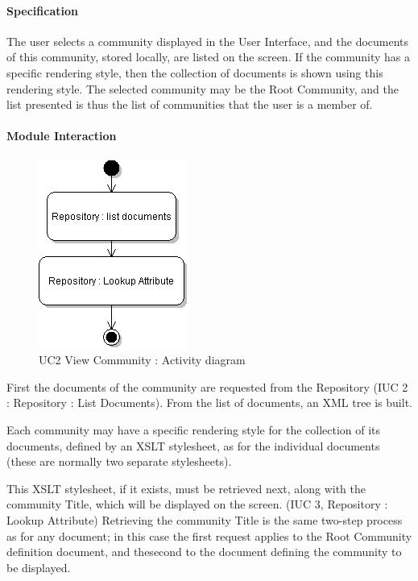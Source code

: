 \documentclass[titlepage]{article}%
\begin{document}
\paragraph{Specification}
The user selects a community displayed in the User Interface, and the documents of this community, stored locally, are listed on the screen. If the community has a specific rendering style, then the collection of documents is shown using this rendering style.
The selected community may be the Root Community, and the list presented is thus the list of communities that the user is a member of. 

\paragraph{Module Interaction}

\begin{figure}[htb]
\centering
	\includegraphics[scale=0.5]{diagrams/uc1-viewcommunity.png}
	\caption{UC2 View Community : Activity diagram}
	\label{fig:uc2}
\end{figure}

First the documents of the community are requested from the Repository (IUC 2 : Repository : List Documents). From the list of documents, an XML tree is built. 

Each community may have a specific rendering style for the collection of its documents, defined by an XSLT stylesheet, as for the individual documents (these are normally two separate stylesheets).

 This XSLT stylesheet, if it exists, must be retrieved next, along with the community Title, which will be displayed on the screen. (IUC 3,  Repository : Lookup Attribute) Retrieving the community Title is the same two-step process as for any document; in this case the first request applies to the Root Community definition document, and thesecond to the document defining the community to be displayed.
\end{document}
